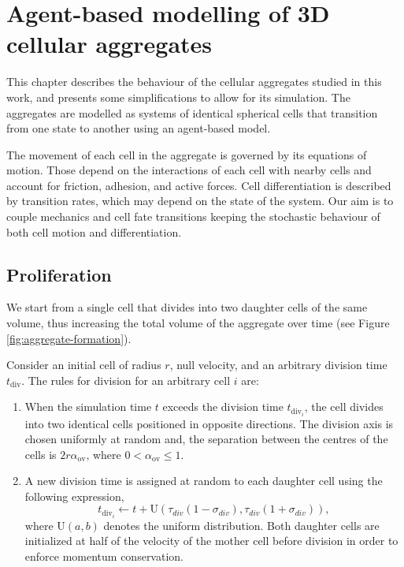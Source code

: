 \chapter[Agent-based modelling of 3D cellular aggregates]{Agent-based modelling of 3D \\ cellular aggregates}\label{ch:2-abm}

This chapter describes the behaviour of the cellular aggregates studied in this work, and presents some simplifications to allow for its simulation. The aggregates are modelled as systems of identical spherical cells that transition from one state to another using an agent-based model.

The movement of each cell in the aggregate is governed by its equations of motion. Those depend on the interactions of each cell with nearby cells and account for friction, adhesion, and active forces. Cell differentiation is described by transition rates, which may depend on the state of the system. Our aim is to couple mechanics and cell fate transitions keeping the stochastic behaviour of both cell motion and differentiation.



\section{Proliferation}

We start from a single cell that divides into two daughter cells of the same vo\-lume, thus increasing the total volume of the aggregate over time (see Figure \ref{fig:aggregate-formation}). 

\begin{definition}
    Consider an initial cell of radius $r$, null velocity, and an arbitrary division time $t_{\text{div}}$. The rules for division for an arbitrary cell $i$ are:
    \begin{enumerate}
        \item When the simulation time $t$ exceeds the division time $t_{\text{div}_i}$, the cell divides into two identical cells positioned in opposite directions. The division axis is chosen uniformly at random and, the separation between the centres of the cells is $2r\alpha_\text{ov}$, where $0<\alpha_\text{ov}\leq1$.
        \item A new division time is assigned at random to each daughter cell using the following expression,
        $$t_{\text{div}_i} \leftarrow t + \text{U}\left(\tau_{div}(1-\sigma_{div}),\tau_{div}(1+\sigma_{div})\right),$$
        where $\text{U}(a,b)$ denotes the uniform distribution. Both daughter cells are initialized at half of the velocity of the mother cell before division in order to enforce momentum conservation.
    \end{enumerate}
\end{definition}

